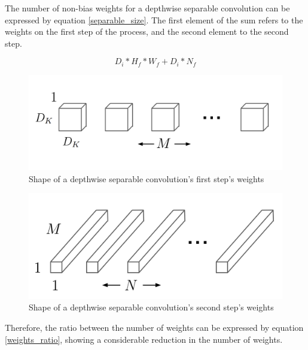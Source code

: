 \documentclass[runningheads]{llncs}
\begin{document}
The number of non-bias weights for a depthwise separable convolution can be expressed by equation \ref{separable_size}. The first element of the sum refers to the weights on the first step of the process, and the second element to the second step.

\begin{equation}
    \label{separable_size}
    D_{i} * H_{f} * W_{f} + D_{i} * N_{f} 
\end{equation}

\begin{figure}
    \begin{center}
        \includegraphics[scale=0.1]{conv_weights_2.png}
        \caption{Shape of a depthwise separable convolution's first step's weights}
        \label{conv_weights_2}
    \end{center}
\end{figure}

\begin{figure}
    \begin{center}
        \includegraphics[scale=0.1]{conv_weights_3.png}
        \caption{Shape of a depthwise separable convolution's second step's weights}
        \label{conv_weights_3}
    \end{center}
\end{figure}

Therefore, the ratio between the number of weights can be expressed by equation \ref{weights_ratio}, showing a considerable reduction in the number of weights.
\end{document}
